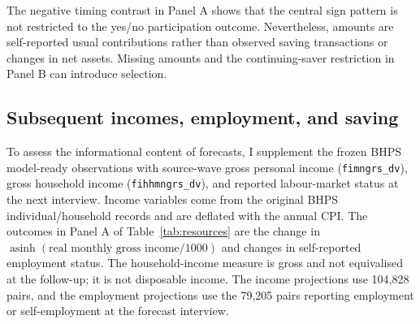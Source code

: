 The negative timing contrast in Panel A shows that the central sign pattern is not restricted to the yes/no participation outcome. Nevertheless, amounts are self-reported usual contributions rather than observed saving transactions or changes in net assets. Missing amounts and the continuing-saver restriction in Panel B can introduce selection.

\subsection{Subsequent incomes, employment, and saving}\label{sec:resourcecheck}

To assess the informational content of forecasts, I supplement the frozen BHPS model-ready observations with source-wave gross personal income (\texttt{fimngrs\_dv}), gross household income (\texttt{fihhmngrs\_dv}), and reported labour-market status at the next interview. Income variables come from the original BHPS individual/household records and are deflated with the annual CPI. The outcomes in Panel A of Table~\ref{tab:resources} are the change in $\operatorname{asinh}(\text{real monthly gross income}/1000)$ and changes in self-reported employment status. The household-income measure is gross and not equivalised at the follow-up; it is not disposable income. The income projections use 104,828 pairs, and the employment projections use the 79,205 pairs reporting employment or self-employment at the forecast interview.

